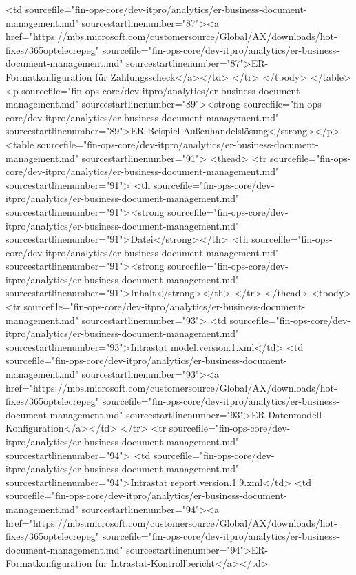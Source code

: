 <td sourcefile="fin-ops-core/dev-itpro/analytics/er-business-document-management.md" sourcestartlinenumber="87"><a href="https://mbs.microsoft.com/customersource/Global/AX/downloads/hot-fixes/365optelecrepeg" sourcefile="fin-ops-core/dev-itpro/analytics/er-business-document-management.md" sourcestartlinenumber="87">ER-Formatkonfiguration für Zahlungsscheck</a></td>
</tr>
</tbody>
</table>
<p sourcefile="fin-ops-core/dev-itpro/analytics/er-business-document-management.md" sourcestartlinenumber="89"><strong sourcefile="fin-ops-core/dev-itpro/analytics/er-business-document-management.md" sourcestartlinenumber="89">ER-Beispiel-Außenhandelslösung</strong></p>
<table sourcefile="fin-ops-core/dev-itpro/analytics/er-business-document-management.md" sourcestartlinenumber="91">
<thead>
<tr sourcefile="fin-ops-core/dev-itpro/analytics/er-business-document-management.md" sourcestartlinenumber="91">
<th sourcefile="fin-ops-core/dev-itpro/analytics/er-business-document-management.md" sourcestartlinenumber="91"><strong sourcefile="fin-ops-core/dev-itpro/analytics/er-business-document-management.md" sourcestartlinenumber="91">Datei</strong></th>
<th sourcefile="fin-ops-core/dev-itpro/analytics/er-business-document-management.md" sourcestartlinenumber="91"><strong sourcefile="fin-ops-core/dev-itpro/analytics/er-business-document-management.md" sourcestartlinenumber="91">Inhalt</strong></th>
</tr>
</thead>
<tbody>
<tr sourcefile="fin-ops-core/dev-itpro/analytics/er-business-document-management.md" sourcestartlinenumber="93">
<td sourcefile="fin-ops-core/dev-itpro/analytics/er-business-document-management.md" sourcestartlinenumber="93">Intrastat model.version.1.xml</td>
<td sourcefile="fin-ops-core/dev-itpro/analytics/er-business-document-management.md" sourcestartlinenumber="93"><a href="https://mbs.microsoft.com/customersource/Global/AX/downloads/hot-fixes/365optelecrepeg" sourcefile="fin-ops-core/dev-itpro/analytics/er-business-document-management.md" sourcestartlinenumber="93">ER-Datenmodell-Konfiguration</a></td>
</tr>
<tr sourcefile="fin-ops-core/dev-itpro/analytics/er-business-document-management.md" sourcestartlinenumber="94">
<td sourcefile="fin-ops-core/dev-itpro/analytics/er-business-document-management.md" sourcestartlinenumber="94">Intrastat report.version.1.9.xml</td>
<td sourcefile="fin-ops-core/dev-itpro/analytics/er-business-document-management.md" sourcestartlinenumber="94"><a href="https://mbs.microsoft.com/customersource/Global/AX/downloads/hot-fixes/365optelecrepeg" sourcefile="fin-ops-core/dev-itpro/analytics/er-business-document-management.md" sourcestartlinenumber="94">ER-Formatkonfiguration für Intrastat-Kontrollbericht</a></td>

